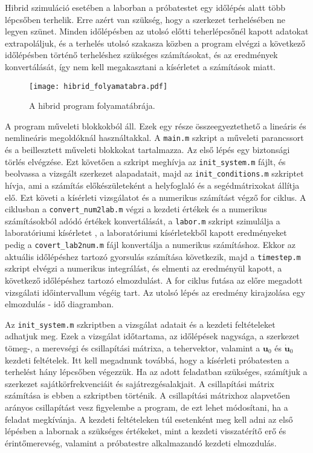  Hibrid szimuláció esetében a laborban a próbatestet egy időlépés alatt több lépcsőben terhelik. Erre azért van szükség, hogy a szerkezet terhelésében ne legyen szünet. Minden időlépésben az utolsó előtti teherlépcsőnél kapott adatokat extrapoláljuk, és a terhelés utolsó szakasza közben a program elvégzi a következő időlépésben történő terheléshez  szükséges számításokat, és az eredmények konvertálását, így nem kell megakasztani a kísérletet a számítások miatt.
 
  

\begin{figure}[h!]
\centering
\texttt{[image: hibrid\_folyamatabra.pdf]}
\caption{A hibrid program folyamatábrája.}
\label{fig:hibridprog_folyamatabra}
\end{figure}

A program műveleti blokkokból áll. Ezek egy része összeegyeztethető a lineáris és nemlineáris megoldóknál használtakkal. A \verb|main.m| szkript a műveleti parancssort és a beillesztett műveleti blokkokat tartalmazza. Az első lépés egy biztonsági törlés elvégzése. Ezt követően a szkript meghívja az \verb|init_system.m| fájlt, és beolvassa a vizsgált szerkezet alapadatait, majd az \verb|init_conditions.m| szkriptet hívja, ami a számítás előkészületeként a helyfoglaló és a  segédmátrixokat állítja elő. Ezt követi a kísérleti vizsgálatot és a numerikus számítást végző for ciklus. A ciklusban a \verb|convert_num2lab.m| végzi a kezdeti értékek és a numerikus számításokból adódó értékek konvertálását, a \verb|labor.m| szkript szimulálja a laboratóriumi kísérletet , a laboratóriumi kísérletekből kapott eredményeket pedig a \verb|covert_lab2num.m| fájl konvertálja a numerikus számításhoz. Ekkor az aktuális  időlépéshez tartozó gyorsulás számítása következik, majd a \verb|timestep.m| szkript elvégzi a numerikus integrálást, és elmenti az eredményül kapott, a következő időlépéshez tartozó elmozdulást. A for ciklus futása az előre megadott vizsgálati időintervallum végéig tart. Az utolsó lépés az eredmény kirajzolása egy elmozdulás - idő diagramban.

Az \verb|init_system.m| szkriptben a vizsgálat  adatait és a kezdeti feltételeket adhatjuk meg. Ezek  a vizsgálat időtartama, az időlépések nagysága, a szerkezet tömeg-, a merevségi és csillapítási mátrixa, a tehervektor, valamint a $\mathbf{u}_0$ és  $\mathbf{\dot{u}}_0$  kezdeti feltételek. Itt kell megadnunk továbbá, hogy a kísérleti próbatesten a terhelést hány lépcsőben végezzük. Ha az adott feladatban szükséges, számítjuk a szerkezet sajátkörfrekvenciáit és sajátrezgésalakjait. A csillapítási mátrix számítása is ebben a szkriptben történik. A csillapítási mátrixhoz alapvetően arányos csillapítást vesz figyelembe a program, de ezt lehet módosítani, ha a feladat megkívánja. A kezdeti feltételeken túl esetenként meg kell adni az első lépésben a labornak a  szükséges értékeket, mint a kezdeti visszatérítő erő és érintőmerevség, valamint a próbatestre alkalmazandó kezdeti elmozdulás.

